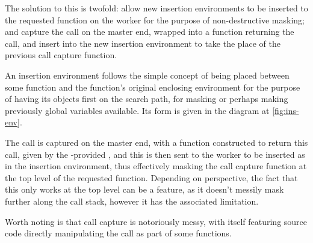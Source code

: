 The solution to this is twofold: allow new insertion environments to be inserted to the requested function on the worker for the purpose of non-destructive masking; and capture the call on the master end, wrapped into a function returning the call, and insert into the new insertion environment to take the place of the previous call capture function.

An insertion environment follows the simple concept of being placed between some function and the function's original enclosing environment for the purpose of having its objects first on the search path, for masking or perhaps making previously global variables available.
Its form is given in the diagram at \cref{fig:ins-env}.


The call is captured on the master end, with a function constructed to return this call, given by the \lso{}-provided , and this is then sent to the worker to be inserted as  in the insertion environment, thus effectively masking the call capture function at the top level of the requested  function.
Depending on perspective, the fact that this only works at the top level can be a feature, as it doesn't messily mask further along the call stack, however it has the associated limitation.

Worth noting is that call capture is notoriously messy, with  itself featuring source code directly manipulating the call as part of some functions.

